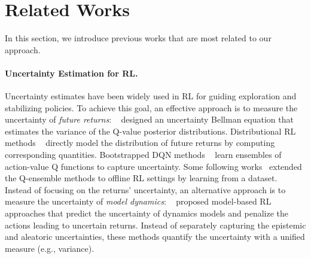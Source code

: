 \documentclass[letterpaper]{article} %
\begin{document}
\section{Related Works}
In this section, we introduce previous works that are most related to our approach.

\paragraph{Uncertainty Estimation for RL.}
Uncertainty estimates have been widely used in RL for guiding exploration and stabilizing policies. To achieve this goal, an effective approach is to measure the uncertainty of {\it future returns}: ~\cite{ODonoghue2018UncertaintyBellman} designed an 
uncertainty Bellman equation that estimates the variance of the Q-value posterior distributions.
Distributional RL methods ~\cite{bellemare2017distributional,Dabney2018DistributionalRL,Mavrin2019DistributionalRL,Zhou2020NonCrossing,Zhou2021Quantile,Tang2018DistribExplore,Zhang2019QUOTA,luo2022distributional} directly model the distribution of future returns by computing corresponding quantities.  Bootstrapped DQN methods ~\cite{Osband2016DeepBootstrapped,Chen2017QEnsembles,Osband2018RandomizedPrior,Silva2020UncertaintyActionAdvise} learn ensembles of action-value Q functions to capture uncertainty. Some following works~\cite{Kumar2019Stable,An2021OfflineQEnsemble} extended the Q-ensemble methods to offline RL settings by learning from a dataset. Instead of focusing on the returns' uncertainty, an alternative approach is to measure the uncertainty of {\it model dynamics}: ~\cite{Yu2020MOPO,Kidambi2020MOReL} proposed model-based RL approaches that predict the uncertainty of dynamics models and penalize the actions leading to uncertain returns. Instead of separately capturing the epistemic and aleatoric uncertainties, these methods quantify the uncertainty with a unified measure (e.g., variance). 

\end{document}
